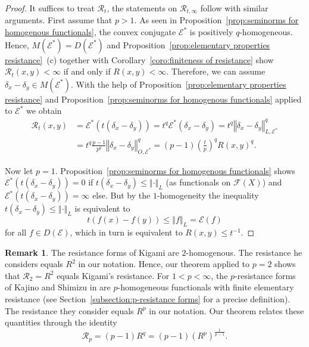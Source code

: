 \documentclass[a4paper,11pt,reqno]{amsart}
\theoremstyle{definition}
\newtheorem{remark}[lemma]{Remark}
\numberwithin{equation}{section}
\newcommand{\cR}{{\mathcal R}}
\newcommand{\cE}{{\mathcal E}}
\newcommand{\cF}{{\mathcal F}}
\newcommand{\av}[1]{\left\Vert #1\right\Vert}
\newcommand{\1}{\mathds{1}}
\begin{document}
\begin{proof}
It suffices to treat $\cR_t$, the statements on $\cR_{t,\infty}$ follow with similar arguments. First assume that $p > 1$. As seen in Proposition~\ref{prop:seminorms for homogenous functionals}, the convex conjugate $\cE^*$ is positively $q$-homogeneous. Hence, $M(\cE^*) = D(\cE^*)$ and Proposition~\ref{prop:elementary properties resistance}~(c) together with Corollary~\ref{coro:finiteness of resistance} show  $\cR_t(x,y) < \infty$ if and only if $R(x,y) < \infty$. Therefore, we can assume $\delta_{x} - \delta_y \in M(\cE^*)$. With the help of   Proposition~\ref{prop:elementary properties resistance}  and  Proposition~\ref{prop:seminorms for homogenous functionals} applied to $\cE^*$ we obtain 
\begin{align*}
 \cR_t(x,y) &= \cE^*(t(\delta_x - \delta_y)) = t^q \cE^*(\delta_x - \delta_y) = t^q \av{\delta_x - \delta_y}^q_{L,\cE^*} \\
 &= t^q \frac{p-1}{p^q} \av{\delta_x - \delta_y}^q_{O,\cE^*} = (p-1) \left(\frac t p\right)^q R(x,y)^q.
\end{align*}

Now let $p = 1$. Proposition~\ref{prop:seminorms for homogenous functionals} shows $\cE^*(t(\delta_x - \delta_y)) = 0$ if $t(\delta_x - \delta_y) \leq \av{\cdot}_L$ (as functionals on $\cF(X)$) and $\cE^*(t(\delta_x - \delta_y)) = \infty$ else. But by the $1$-homogeneity the inequality $t(\delta_x - \delta_y) \leq \av{\cdot}_L$  is equivalent to 
%
$$t (f(x) - f(y)) \leq \av{f}_L = \cE(f)$$
%
for all $f \in D(\cE)$, which in turn is equivalent to $R(x,y) \leq t^{-1}$.
\end{proof}

 \begin{remark}\label{remark:comparing resistances}
  The resistance forms of Kigami \cite{Kig03} are $2$-homogenous. The resistance he considers equals $R^2$ in our notation. Hence, our theorem  applied to $p = 2$ shows that $\mathcal R_2 = R^2$ equals Kigami's resistance. For $1 <  p < \infty$, the $p$-resistance forms of Kajino and Shimizu in \cite{KS25} are $p$-homogeneous functionals with finite elementary resistance (see Section~\ref{subsection:p-resistance forms} for a precise definition). The resistance they consider equals $R^p$ in our notation. Our theorem relates these quantities through the identity
  $$\mathcal R_p = (p-1) R^q = (p-1) (R^p)^\frac{1}{p-1}.$$
 \end{remark}
\end{document}
